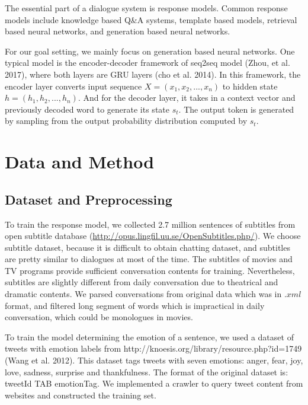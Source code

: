 \documentclass{article}
\begin{document}
The essential part of a dialogue system is response models. Common response models include knowledge based Q\&A systems, template based models, retrieval based neural networks, and generation based neural networks. \par



For our goal setting, we mainly focus on generation based neural networks. One typical model is the encoder-decoder framework of seq2seq model (Zhou, et al. 2017), where both layers are GRU layers (cho et al. 2014). In this framework, the encoder layer converts input sequence $X = (x_1, x_2, ..., x_n)$ to hidden state $h = (h_1, h_2, ..., h_n)$. And for the decoder layer, it takes in a context vector and previously decoded word to generate its state $s_t$. The output token is generated by sampling from the output probability distribution computed by $s_t$.




\section{Data and Method}

\subsection{Dataset and Preprocessing}

To train the response model, we collected 2.7 million sentences of subtitles from open subtitle database (\url{http://opus.lingfil.uu.se/OpenSubtitles.php/}). We choose subtitle dataset, because it is difficult to obtain chatting dataset, and subtitles are pretty similar to dialogues at most of the time. The subtitles of movies and TV programs provide sufficient conversation contents for training. Nevertheless, subtitles are slightly different from daily conversation due to theatrical and dramatic contents. We parsed conversations from original data which was in $.xml$ format, and filtered long segment of words which is impractical in daily conversation, which could be monologues in movies. \par

To train the model determining the emotion of a sentence, we used a dataset of tweets with emotion labels from http://knoesis.org/library/resource.php?id=1749 (Wang et al. 2012). This dataset tags tweets with seven emotions: anger, fear, joy, love, sadness, surprise and thankfulness. The format of the original dataset is: tweetId TAB emotionTag. We implemented a crawler to query tweet content from websites and constructed the training set. \par 
\end{document}
